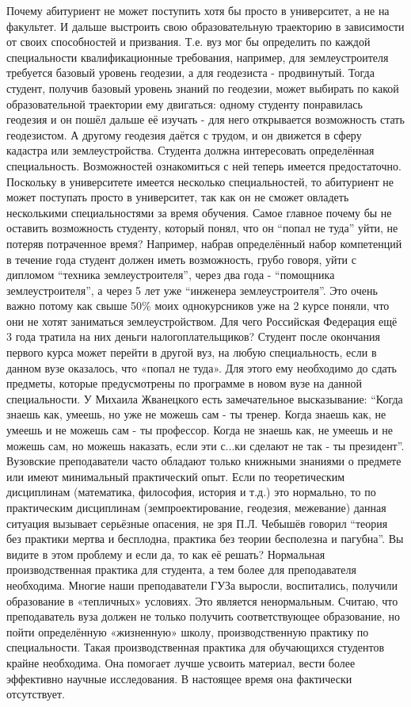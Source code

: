 \begin{drama}
	\maxspeaks Почему абитуриент не может поступить хотя бы просто в университет, а не на факультет. И дальше выстроить свою образовательную траекторию в зависимости от своих способностей и призвания. Т.е. вуз мог бы определить по каждой специальности квалификационные требования, например, для землеустроителя требуется базовый уровень геодезии, а для геодезиста - продвинутый.  Тогда студент, получив базовый уровень знаний по геодезии, может выбирать по какой образовательной траектории ему двигаться: одному студенту понравилась геодезия и он пошёл дальше её изучать - для него открывается возможность стать геодезистом. А другому геодезия даётся с трудом, и он движется в сферу кадастра или землеустройства. 
	\michaelspeaks Студента должна интересовать определённая специальность. Возможностей ознакомиться с ней теперь имеется предостаточно. Поскольку в университете имеется несколько специальностей, то абитуриент не может поступать просто в университет, так как он не сможет овладеть несколькими специальностями за время обучения.
	\maxspeaks Самое главное почему бы не оставить возможность студенту, который понял, что он “попал не туда” уйти, не потеряв потраченное время? Например, набрав определённый набор компетенций в течение года студент должен иметь возможность, грубо говоря, уйти с дипломом “техника землеустроителя”, через два года - “помощника землеустроителя”, а через 5 лет уже “инженера землеустроителя”. Это очень важно потому как свыше 50\% моих однокурсников уже на 2 курсе поняли, что они не хотят заниматься землеустройством. Для чего Российская Федерация ещё 3 года тратила на них деньги налогоплательщиков?
	\michaelspeaks Студент после окончания первого курса может перейти в другой вуз, на любую специальность, если в данном вузе оказалось, что «попал не туда». Для этого ему необходимо до сдать предметы, которые предусмотрены по программе в новом вузе на данной специальности.
	\maxspeaks У Михаила Жванецкого есть замечательное высказывание: “Когда знаешь как, умеешь, но уже не можешь сам - ты тренер. Когда знаешь как, не умеешь и не можешь сам - ты профессор. Когда не знаешь как, не умеешь и не можешь сам, но можешь наказать, если эти с...ки сделают не так - ты президент”. Вузовские преподаватели часто обладают только книжными знаниями о предмете или имеют минимальный практический опыт. Если по теоретическим дисциплинам (математика, философия, история и т.д.) это нормально, то по практическим дисциплинам (земпроектирование, геодезия, межевание) данная ситуация вызывает серьёзные опасения, не зря П.Л. Чебышёв говорил “теория без практики мертва и бесплодна, практика без теории бесполезна и пагубна”. Вы видите в этом проблему и если да, то как её решать?
	\michaelspeaks Нормальная производственная практика для студента, а тем более для преподавателя необходима. Многие наши преподаватели ГУЗа выросли, воспитались, получили образование в «тепличных» условиях. Это является ненормальным. Считаю, что преподаватель вуза должен не только получить соответствующее образование, но пойти определённую «жизненную» школу, производственную практику по специальности. Такая производственная практика для обучающихся студентов крайне необходима. Она помогает лучше усвоить материал, вести более эффективно научные исследования. В настоящее время она фактически отсутствует.
	

\end{drama}
